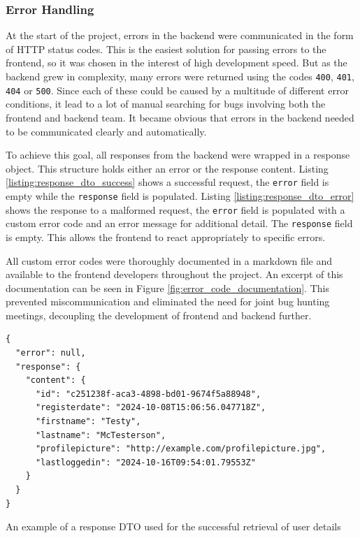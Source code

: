 \newpage{}

\subsubsection{Error Handling}

At the start of the project, errors in the backend were communicated in the form
of HTTP status codes. This is the easiest solution for passing errors to the
frontend, so it was chosen in the interest of high development speed. But as the
backend grew in complexity, many errors were returned using the codes
\texttt{400}, \texttt{401}, \texttt{404} or \texttt{500}. Since each of these
could be caused by a multitude of different error conditions, it lead to a lot
of manual searching for bugs involving both the frontend and backend team. It
became obvious that errors in the backend needed to be communicated clearly and
automatically.

To achieve this goal, all responses from the backend were wrapped in a response
object. This structure holds either an error or the response content. Listing
\ref{listing:response_dto_success} shows a successful request, the
\texttt{error} field is empty while the \texttt{response} field is populated.
Listing \ref{listing:response_dto_error} shows the response to a malformed
request, the \texttt{error} field is populated with a custom error code and an
error message for additional detail. The \texttt{response} field is empty. This
allows the frontend to react appropriately to specific errors.

All custom error codes were thoroughly documented in a markdown file and
available to the frontend developers throughout the project. An excerpt of this
documentation can be seen in Figure \ref{fig:error_code_documentation}. This
prevented miscommunication and eliminated the need for joint bug hunting
meetings, decoupling the development of frontend and backend further.



\begin{listing}[htbp]
  \centering{}
  \begin{minipage}{0.825\textwidth}
  \begin{verbatim}
{
  "error": null,
  "response": {
    "content": {
      "id": "c251238f-aca3-4898-bd01-9674f5a88948",
      "registerdate": "2024-10-08T15:06:56.047718Z",
      "firstname": "Testy",
      "lastname": "McTesterson",
      "profilepicture": "http://example.com/profilepicture.jpg",
      "lastloggedin": "2024-10-16T09:54:01.79553Z"
    }
  }
}
  \end{verbatim}
  \end{minipage}
  \caption{An example of a response DTO used for the successful retrieval of user details}
  \label{listing:response_dto_success}
\end{listing}

